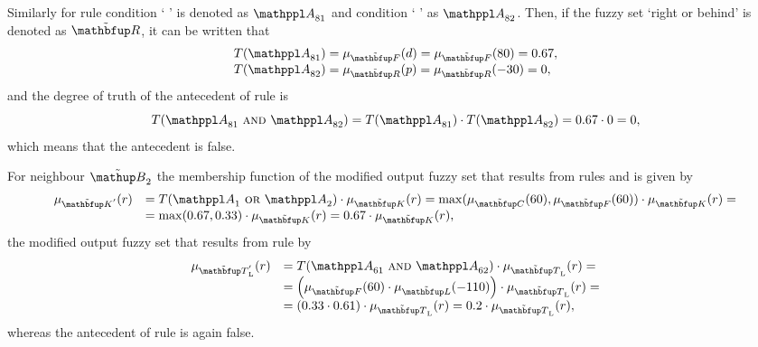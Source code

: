 Similarly for rule  condition `  ' is denoted as $\statement{A}_{81}$ and condition `  ' as $\statement{A}_{82}$. Then, if the fuzzy set `right or behind' is denoted as $\fset{R}$, it can be written that
%
\begin{equation}
\begin{array}{ll}
T(\statement{A}_{81})=\mu_\fset{F}(d)=\mu_\fset{F}(80)=0.67, \\
T(\statement{A}_{82})=\mu_\fset{R}(p)=\mu_\fset{R}(-30)=0,
\end{array}
\end{equation}
%
and the degree of truth of the antecedent of rule  is
%
\begin{equation}
T(\statement{A}_{81}\ \kwd{and}\ \statement{A}_{82})=T(\statement{A}_{81}) \cdot T(\statement{A}_{82})=0.67 \cdot 0 = 0,
\end{equation}
%
which means that the antecedent is false.

For neighbour $\fautom{B}_2$ the membership function of the modified output fuzzy set that results from rules  and  is given by
%
\begin{equation}
\begin{array}{rl}
\mu_{\fset{K}'}(r)&=T(\statement{A}_1\ \kwd{or}\ \statement{A}_2) \cdot \mu_\fset{K}(r)=\max(\mu_\fset{C}(60),\mu_\fset{F}(60)) \cdot \mu_\fset{K}(r)= \\
                  &=\max(0.67,0.33) \cdot \mu_\fset{K}(r)=0.67 \cdot \mu_\fset{K}(r),
\end{array}
\end{equation}
%
the modified output fuzzy set that results from rule  by 
%
\begin{equation}
\begin{array}{rl}
\mu_{{\fset{T}_\textnormal{L}}'}(r)&=T(\statement{A}_{61}\ \kwd{and}\ \statement{A}_{62}) \cdot \mu_{\fset{T}_\textnormal{L}}(r)=\\
                               &=\left(\mu_\fset{F}(60) \cdot \mu_\fset{L}(-110)\right) \cdot \mu_{\fset{T}_\textnormal{L}}(r)=\\
                               &=\left(0.33 \cdot 0.61\right) \cdot \mu_{\fset{T}_\textnormal{L}}(r)=0.2 \cdot \mu_{\fset{T}_\textnormal{L}}(r),
\end{array}
\end{equation}
%
whereas the antecedent of rule  is again false.

